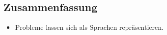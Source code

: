 


\subsection{Zusammenfassung}
\begin{itemize}
    \item Probleme lassen sich als Sprachen repräsentieren.
\end{itemize}
